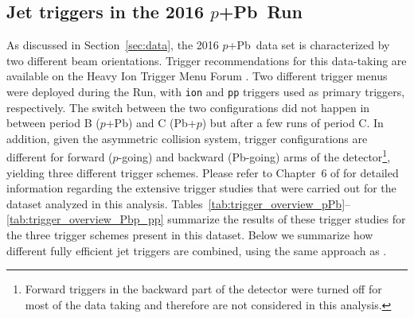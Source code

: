 \documentclass[NOTE, atlasdraft=true, texlive=2020, UKenglish]{atlasdoc}
\newcommand{\pxPb}{$p$+Pb}
\newcommand{\Pbxp}{Pb+$p$}
\begin{document}
\subsection{Jet triggers in the 2016 \pxPb~Run}
As discussed in Section~\ref{sec:data}, the 2016 \pxPb\, data set is characterized by two different beam orientations. Trigger recommendations for this data-taking are available on the Heavy Ion Trigger Menu Forum \cite{TriggerForum:pPb2016}. Two different trigger menus were deployed during the Run, with \texttt{ion} and \texttt{pp} triggers used as primary triggers, respectively. The switch between the two configurations did not happen in between period B (\pxPb) and C (\Pbxp) but after a few runs of period C. In addition, given the asymmetric collision system, trigger configurations are different for forward ($p$-going) and backward (Pb-going) arms of the detector\footnote{Forward triggers in the backward part of the detector were turned off for most of the data taking and therefore are not considered in this analysis.}, yielding three different trigger schemes. 
Please refer to Chapter~6 of \cite{Longo:2860813} for detailed information regarding the extensive trigger studies that were carried out for the dataset analyzed in this analysis.  Tables~\ref{tab:trigger_overview_pPb}--\ref{tab:trigger_overview_Pbp_pp} summarize the results of these trigger studies for the three trigger schemes present in this dataset.
Below we summarize how different fully efficient jet triggers are combined, using the same approach as \cite{ATLAS:2023zfx}.
\end{document}
